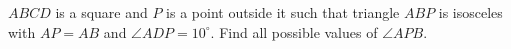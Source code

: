$ABCD$ is a square and $P$ is a point outside it such that triangle $ABP$ is isosceles with $AP=AB$ and $\angle ADP=10^\circ$. Find all possible values of $\angle APB$.

